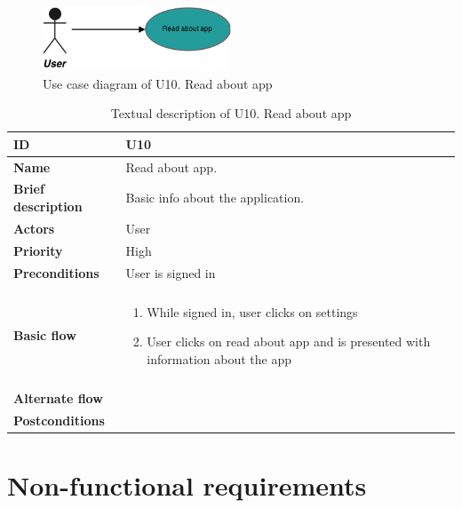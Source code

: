 \begin{figure}[hp]
	\includegraphics[width=0.5\textwidth]{fig/U10}
	\centering
	\caption{Use case diagram of U10. Read about app}
	\label{Fig:U10}
\end{figure}

\begin{table}[hp]
	\renewcommand{\arraystretch}{1.5}
	\centering
	\caption{Textual description of U10. Read about app}
	\begin{tabular}[b]{|l | l|}\hline
		\textbf{ID} 				& U10									\\\hline
		\textbf{Name} 				& Read about app.						\\\hline
		\textbf{Brief description}	& Basic info about the application. 	\\\hline
		\textbf{Actors} 			& User									\\\hline
		\textbf{Priority}			& High									\\\hline
		\textbf{Preconditions}		& User is signed in						\\\hline&\\[-2ex]
		\textbf{Basic flow}			& \begin{minipage}{5in}
			\begin{enumerate}[noitemsep]
				\item While signed in, user clicks on settings
				\item User clicks on read about app and is presented with information about the app
			\end{enumerate}						
		\end{minipage}						\\\hline&\\[-2ex]
		\textbf{Alternate flow}		& \begin{minipage}{5in}
		\end{minipage}							\\\hline
		\textbf{Postconditions}		& \\\hline
	\end{tabular}
	\label{Tab:U10}
\end{table}

\pagebreak
\section{Non-functional requirements}
\label{sec:non-functional_requirements}

